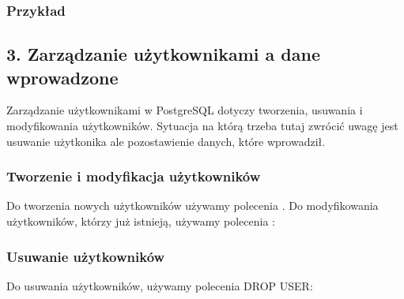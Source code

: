 \documentclass[letterpaper,10pt,polish]{sphinxmanual}
\begin{document}
\subsubsection{Przykład}
\label{\detokenize{rozdzial2/bezpieczenstwo/index:przyklad}}
\begin{sphinxVerbatim}[commandchars=\\\{\}]
      
     
\end{sphinxVerbatim}


\subsection{3. Zarządzanie użytkownikami a dane wprowadzone}
\label{\detokenize{rozdzial2/bezpieczenstwo/index:zarzadzanie-uzytkownikami-a-dane-wprowadzone}}
\sphinxAtStartPar
Zarządzanie użytkownikami w PostgreSQL dotyczy tworzenia, usuwania i modyfikowania użytkowników. Sytuacja na którą trzeba tutaj zwrócić uwagę jest usuwanie użytkonika ale pozostawienie danych, które wprowadził.


\subsubsection{Tworzenie i modyfikacja użytkowników}
\label{\detokenize{rozdzial2/bezpieczenstwo/index:tworzenie-i-modyfikacja-uzytkownikow}}
\sphinxAtStartPar
Do tworzenia nowych użytkowników używamy polecenia . Do modyfikowania użytkowników, którzy już istnieją, używamy polecenia :

\begin{sphinxVerbatim}[commandchars=\\\{\}]
     
     
\end{sphinxVerbatim}


\subsubsection{Usuwanie użytkowników}
\label{\detokenize{rozdzial2/bezpieczenstwo/index:usuwanie-uzytkownikow}}
\sphinxAtStartPar
Do usuwania użytkowników, używamy polecenia {\color{red}\bfseries{}\textasciigrave{}\textasciigrave{}}DROP USER\textasciigrave{}:
\end{document}
